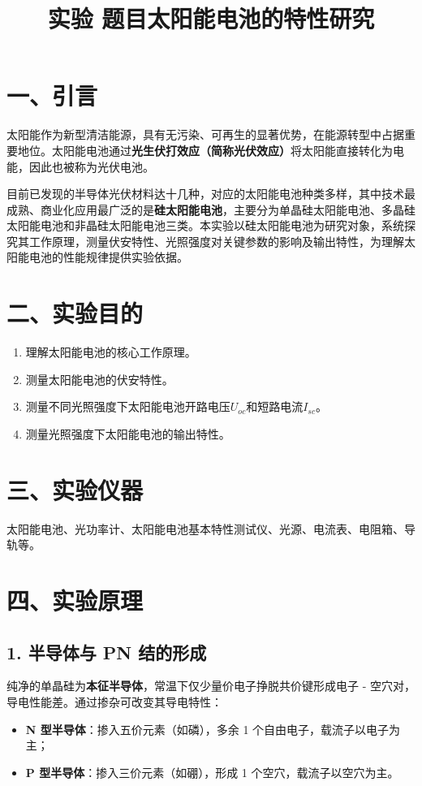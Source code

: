 \documentclass[12pt]{article}
\begin{document}
\title{实验 题目太阳能电池的特性研究}
\author{}
\date{}
\maketitle

\section{一、引言}
太阳能作为新型清洁能源，具有无污染、可再生的显著优势，在能源转型中占据重要地位。太阳能电池通过\textbf{光生伏打效应（简称光伏效应）}将太阳能直接转化为电能，因此也被称为光伏电池。

目前已发现的半导体光伏材料达十几种，对应的太阳能电池种类多样，其中技术最成熟、商业化应用最广泛的是\textbf{硅太阳能电池}，主要分为单晶硅太阳能电池、多晶硅太阳能电池和非晶硅太阳能电池三类。本实验以硅太阳能电池为研究对象，系统探究其工作原理，测量伏安特性、光照强度对关键参数的影响及输出特性，为理解太阳能电池的性能规律提供实验依据。

\section{二、实验目的}
\begin{enumerate}
  \item 理解太阳能电池的核心工作原理。
  \item 测量太阳能电池的伏安特性。
  \item 测量不同光照强度下太阳能电池开路电压$U_{oc}$和短路电流$I_{sc}$。
  \item 测量光照强度下太阳能电池的输出特性。
\end{enumerate}

\section{三、实验仪器}
太阳能电池、光功率计、太阳能电池基本特性测试仪、光源、电流表、电阻箱、导轨等。

\section{四、实验原理}
\subsection{1. 半导体与 PN 结的形成}
纯净的单晶硅为\textbf{本征半导体}，常温下仅少量价电子挣脱共价键形成电子 - 空穴对，导电性能差。通过掺杂可改变其导电特性：
\begin{itemize}
  \item \textbf{N 型半导体}：掺入五价元素（如磷），多余 1 个自由电子，载流子以电子为主；
  \item \textbf{P 型半导体}：掺入三价元素（如硼），形成 1 个空穴，载流子以空穴为主。
\end{itemize}
\end{document}
